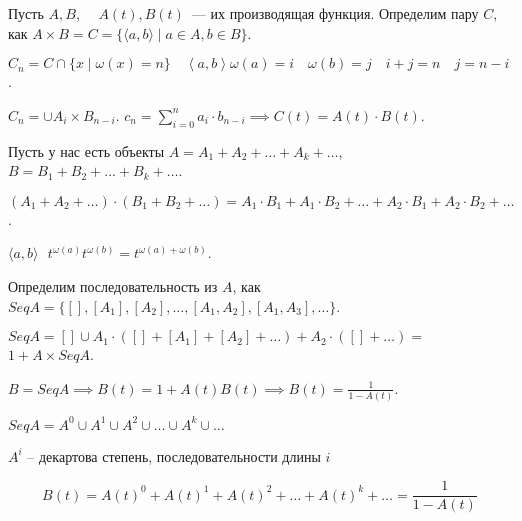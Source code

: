 \begin{definition}
    
    Пусть $A, B$,~~ $A(t), B(t)$~--- их производящая функция. Определим пару $C$, как $A \times B = C = \{ \langle a, b \rangle \mid a \in A, b\in B \}$.

    $C_n = C \cap \{x \mid \omega(x) = n\}\quad \left<a, b \right> \omega(a) = i\quad \omega(b) = j\quad i + j = n\quad j = n-i$.

    $C_n = \cup A_i \times B_{n-i}$. $c_n = \sum_{i=0}^n a_i \cdot b_{n-i} \implies C(t) = A(t) \cdot B(t)$.
\end{definition}

\begin{note}
    Пусть у нас есть объекты $A = A_1 + A_2 + \ldots + A_k + \ldots$,\quad    $B = B_1 + B_2 + \ldots + B_k + \ldots$.

    $\left( A_1 + A_2 + \dots \right) \cdot\left( B_1 +B_2 +\dots  \right) = A_1 \cdot B_1 + A_1 \cdot B_2 + \ldots + A_2 \cdot B_1 + A_2 \cdot B_2 + \ldots $.

    $\langle a, b \rangle ~~~ t^{\omega(a)} t ^{\omega (b)} = t ^{\omega (a) + \omega (b)}$.
\end{note}

\begin{definition}
    Определим последовательность из $A$, как $Seq A = \{ [], [A_1], [A_2], \ldots, [A_1, A_2], [A_1, A_3], \ldots\}$.

    $Seq A =  [] \cup A_1 \cdot \left( [] + [A_1] + [A_2] + \dots\right) + A_2 \cdot \left( [] + \dots \right) = $
    $1 + A \times Seq A$.

    $B = Seq A \implies B(t) = 1 + A(t)B(t) \implies B(t) = \frac{1}{1 - A(t)}$.

\end{definition}


\begin{definition}
    $Seq A = A^0 \cup A^1 \cup A^2 \cup  \ldots \cup A^k \cup \ldots$
    
    $A^i$ -- декартова степень, последовательности длины $i$

    \[B(t) = A(t)^0 + A(t)^1 + A(t)^2 + \ldots + A(t)^k + \ldots = \frac{1}{1 - A(t)}\]
\end{definition}

